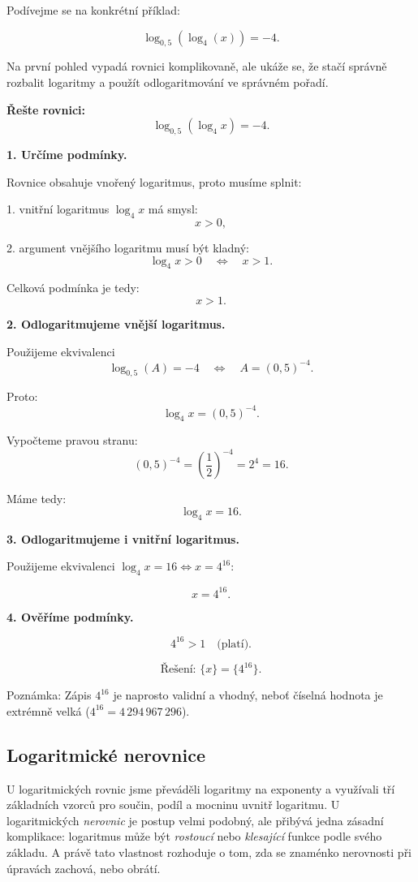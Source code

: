 \documentclass[12pt,a4paper]{article}
\begin{document}
Podívejme se na konkrétní příklad:

\[
\log_{0{,}5}\left(\log_4(x)\right) = -4.
\]

Na první pohled vypadá rovnici komplikovaně, ale ukáže se, že stačí správně rozbalit
logaritmy a použít odlogaritmování ve správném pořadí.

\begin{examplebox}
\textbf{Řešte rovnici:}
\[
\log_{0{,}5}(\log_4 x) = -4.
\]


\textbf{1. Určíme podmínky.}

Rovnice obsahuje vnořený logaritmus, proto musíme splnit:

1. vnitřní logaritmus $\log_4 x$ má smysl:
\[
x > 0,
\]

2. argument vnějšího logaritmu musí být kladný:
\[
\log_4 x > 0
\quad\Longleftrightarrow\quad
x > 1.
\]

Celková podmínka je tedy:
\[
x > 1.
\]

\textbf{2. Odlogaritmujeme vnější logaritmus.}

Použijeme ekvivalenci
\[
\log_{0{,}5}(A) = -4 \quad\Longleftrightarrow\quad A = (0{,}5)^{-4}.
\]

Proto:
\[
\log_4 x = (0{,}5)^{-4}.
\]

Vypočteme pravou stranu:
\[
(0{,}5)^{-4} = \left(\frac{1}{2}\right)^{-4} = 2^{4} = 16.
\]

Máme tedy:
\[
\log_4 x = 16.
\]

\textbf{3. Odlogaritmujeme i vnitřní logaritmus.}

Použijeme ekvivalenci $\log_4 x = 16 \Longleftrightarrow x = 4^{16}$:

\[
x = 4^{16}.
\]

\textbf{4. Ověříme podmínky.}

\[
4^{16} > 1 \quad\text{(platí)}.
\]

\[
\text{Řešení: } \{x\} = \{4^{16}\}.
\]

Poznámka: Zápis $4^{16}$ je naprosto validní a vhodný, neboť číselná hodnota je
extrémně velká ($4^{16} = 4\,294\,967\,296$).
\end{examplebox}



\subsection{Logaritmické nerovnice}

U logaritmických rovnic jsme převáděli logaritmy na exponenty a využívali tří
základních vzorců pro součin, podíl a mocninu uvnitř logaritmu. U logaritmických
\emph{nerovnic} je postup velmi podobný, ale přibývá jedna zásadní komplikace:
logaritmus může být \emph{rostoucí} nebo \emph{klesající} funkce podle svého
základu. A právě tato vlastnost rozhoduje o tom, zda se znaménko nerovnosti
při úpravách zachová, nebo obrátí.
\end{document}
